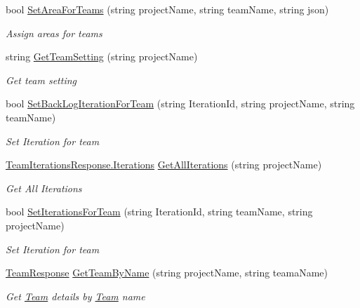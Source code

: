 \begin{DoxyCompactItemize}
bool \mbox{\hyperlink{class_vsts_rest_a_p_i_1_1_projects_and_teams_1_1_team_ab7ec4e48d49881e50a0a7aae20ede38a}{Set\+Area\+For\+Teams}} (string project\+Name, string team\+Name, string json)
\begin{DoxyCompactList}\small\item\em Assign areas for teams \end{DoxyCompactList}\item 
string \mbox{\hyperlink{class_vsts_rest_a_p_i_1_1_projects_and_teams_1_1_team_af1ece216c9baa58c5e8b2a527318ba3c}{Get\+Team\+Setting}} (string project\+Name)
\begin{DoxyCompactList}\small\item\em Get team setting \end{DoxyCompactList}\item 
bool \mbox{\hyperlink{class_vsts_rest_a_p_i_1_1_projects_and_teams_1_1_team_a9edc630def2d89f784812cf88f706a4c}{Set\+Back\+Log\+Iteration\+For\+Team}} (string Iteration\+Id, string project\+Name, string team\+Name)
\begin{DoxyCompactList}\small\item\em Set Iteration for team \end{DoxyCompactList}\item 
\mbox{\hyperlink{class_vsts_rest_a_p_i_1_1_viewmodel_1_1_project_and_teams_1_1_team_iterations_response_1_1_iterations}{Team\+Iterations\+Response.\+Iterations}} \mbox{\hyperlink{class_vsts_rest_a_p_i_1_1_projects_and_teams_1_1_team_a719daa0225d480d779037baaa901c201}{Get\+All\+Iterations}} (string project\+Name)
\begin{DoxyCompactList}\small\item\em Get All Iterations \end{DoxyCompactList}\item 
bool \mbox{\hyperlink{class_vsts_rest_a_p_i_1_1_projects_and_teams_1_1_team_a513442a4bc421f2b3f0fb980d1c6ed72}{Set\+Iterations\+For\+Team}} (string Iteration\+Id, string team\+Name, string project\+Name)
\begin{DoxyCompactList}\small\item\em Set Iteration for team \end{DoxyCompactList}\item 
\mbox{\hyperlink{class_vsts_rest_a_p_i_1_1_viewmodel_1_1_project_and_teams_1_1_team_response}{Team\+Response}} \mbox{\hyperlink{class_vsts_rest_a_p_i_1_1_projects_and_teams_1_1_team_a252afe1d5826c3251ace46c5e36dcb39}{Get\+Team\+By\+Name}} (string project\+Name, string teama\+Name)
\begin{DoxyCompactList}\small\item\em Get \mbox{\hyperlink{class_vsts_rest_a_p_i_1_1_projects_and_teams_1_1_team}{Team}} details by \mbox{\hyperlink{class_vsts_rest_a_p_i_1_1_projects_and_teams_1_1_team}{Team}} name \end{DoxyCompactList}\end{DoxyCompactItemize}
